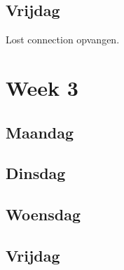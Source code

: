 \documentclass[12pt]{article}
\begin{document}
\subsection*{Vrijdag}
Lost connection opvangen.

\section*{Week 3}
\subsection*{Maandag}
\subsection*{Dinsdag}
\subsection*{Woensdag}
\subsection*{Vrijdag}
\end{document}
